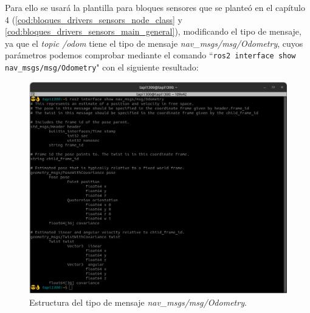 Para ello se usará la plantilla para bloques sensores que se planteó en el capítulo 4 (\ref{cod:bloques_drivers_sensors_node_class} y \ref{cod:bloques_drivers_sensors_main_general}),
modificando el tipo de mensaje, ya que el \textit{topic /odom} tiene el tipo de mensaje \textit{nav\_msgs/msg/Odometry}, cuyos parámetros podemos comprobar mediante el comando 
``\lstinline|ros2 interface show nav_msgs/msg/Odometry|" con el siguiente resultado:
\begin{figure} [H]
    \begin{center}
        \includegraphics[width=12cm]{figs/c6/odom_msg.png}
    \end{center}
    \caption[Estructura mensaje Odometría]{Estructura del tipo de mensaje \textit{nav\_msgs/msg/Odometry}.}
    \label{fig:odom_struct}
\end{figure}

